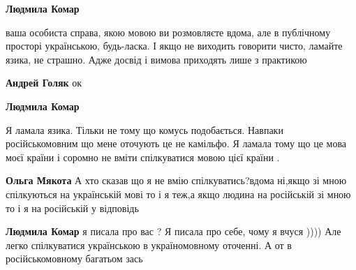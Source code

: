 \begin{itemize}
\begin{itemize}
\textbf{Людмила Комар} 

ваша особиста справа, якою мовою ви розмовляєте вдома, але в публічному
просторі українською, будь-ласка. І якщо не виходить говорити чисто, ламайте
язика, не страшно. Адже досвід і вимова приходять лише з практикою


 
\textbf{Андрей Голяк} ок

 
\textbf{Людмила Комар} 

Я ламала язика. Тільки не тому що комусь подобається. Навпаки російськомовним
що мене оточують це не камільфо. Я ламала тому що це мова моєї країни і соромно
не вміти спілкуватися мовою цієї країни .

 
\textbf{Ольга Мякота} А хто сказав що я не вмію спілкуватись?вдома ні,якщо зі мною спілкуються на українській мові то і я теж,а якщо людина на російській зі мною то і я на російській у відповідь

 
\textbf{Людмила Комар} я писала про вас ? Я писала про себе, чому я вчуся )))) Але легко спілкуватися українською в україномовному оточенні. А от в російськомовному багатьом зась

 

\end{itemize}
\end{itemize}
